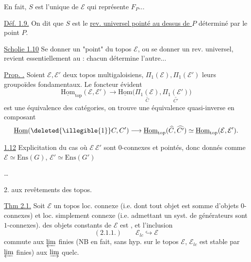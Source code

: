 En fait, \(S\) est l'unique 
de \(\mathcal E\) qui représente \(F_P\)...

\uline{Déf. 1.9.} On dit que \(S\)
 est le
\uline{rev. universel pointé au dessus de \(P\)} déterminé
par le point \(P\).

\uline{Scholie 1.10} Se donner un "point" du \unsure{:}
topos  \(\mathcal E\), ou se donner un
rev. universel, revient essentiellement au
\unsure{\(\stackrel{-}{\sim}\)} : chacun détermine l'autre...

\uline{Prop. .} Soient $\mathcal E,\mathcal E'$ deux topos multigaloisiens, $\Pi_1(\mathcal E),\Pi_1(\mathcal E')$ leurs groupoïdes fondamentaux. Le foncteur évident
\[
\underline{\mathrm{Hom}}_{\mathrm{top}}(\mathcal E,\mathcal E')
\longrightarrow
\underline{\mathrm{Hom}}\bigl(
\underset{C}{\underline{\Pi_1(\mathcal E)}},
\underset{C'}{\underline{\Pi_1(\mathcal E')}}\bigr)
\]
est une équivalence des catégories, on trouve une équivalence quasi-inverse en composant
\[
\underline{\mathrm{Hom}}(\deleted{\illegible{1}}C,C')
\longrightarrow
\underline{\mathrm{Hom}}_{\mathrm{top}}(\widehat C,\widehat {C'})
\simeq
\underline{\mathrm{Hom}}_{\mathrm{top}}(\mathcal E,\mathcal E').
\]

\uline{1.12} Explicitation du cas où $\mathcal E\ \mathcal E'$ sont $0$-connexes et pointés, donc donnés comme $\mathcal E\simeq\mathrm{Ens}(G)$, $\mathcal E'\simeq\mathrm{Ens}(G')$

\dots


2.  aux revêtements des topos.

\uline{Thm 2.1.} Soit $\mathcal E$ un topos loc. connexe (i.e. dont tout objet est somme d'objets $0$-connexes) et loc. simplement connexe (i.e. admettant un syst. de générateurs  sont $1$-connexes).
 des objets  constants de $\mathcal E$ est  , et l'inclusion
\[
(2.1.1.)\qquad \mathcal E_{lc}\hookrightarrow\mathcal E
\]
commute aux $\varprojlim$ finies (NB en fait, sans hyp. sur le topos $\mathcal E$, $\mathcal E_{lc}$ est stable par $\varprojlim$ finies)  aux $\varinjlim$ quelc.

